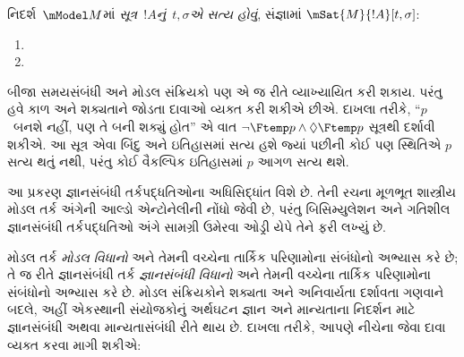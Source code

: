 \begin{defn}
  નિદર્શ~$\mModel M$માં \emph{સૂત્ર~$!A$નું~$t, \sigma$એ સત્ય હોવું},
  સંજ્ઞામાં $\mSat{M}{!A}[t, \sigma]$:
  \begin{enumerate}
  \item{} 
  \item{} 
  \end{enumerate} 
\end{defn}

બીજા સમયસંબંધી અને મોડલ સંક્રિયકો પણ એ જ રીતે વ્યાખ્યાયિત કરી
શકાય. પરંતુ હવે કાળ અને શક્યતાને જોડતા દાવાઓ વ્યક્ત કરી શકીએ છીએ.
દાખલા તરીકે, ``$p$~બનશે નહીં, પણ તે બની શક્યું હોત'' એ વાત
$\lnot \Ftemp p \land \Diamond \Ftemp p$ સૂત્રથી દર્શાવી શકીએ.
આ સૂત્ર એવા બિંદુ અને ઇતિહાસમાં સત્ય હશે જ્યાં પછીની કોઈ પણ સ્થિતિએ
$p$ સત્ય થતું નથી, પરંતુ કોઈ વૈકલ્પિક ઇતિહાસમાં $p$ આગળ સત્ય થશે.
\endgroup


\OLEndPartHook
\endgroup


\begingroup
\makeatletter{}\makeatother

\label{guunit:OLP-0482}


\begin{editorial}
  આ પ્રકરણ જ્ઞાનસંબંધી તર્કપદ્ધતિઓના અધિસિદ્ધાંત વિશે છે. તેની
  રચના મૂળભૂત શાસ્ત્રીય મોડલ તર્ક અંગેની આલ્ડો એન્ટોનેલીની નોંધો
  જેવી છે, પરંતુ બિસિમ્યુલેશન અને ગતિશીલ જ્ઞાનસંબંધી તર્કપદ્ધતિઓ
  અંગે સામગ્રી ઉમેરવા ઓડ્રી યેપે તેને ફરી લખ્યું છે.
\end{editorial}

\begingroup
\makeatletter{}\makeatother


\label{guunit:OLP-0483}


મોડલ તર્ક \emph{મોડલ વિધાનો} અને તેમની વચ્ચેના તાર્કિક પરિણામોના
સંબંધોનો અભ્યાસ કરે છે; તે જ રીતે જ્ઞાનસંબંધી તર્ક
\emph{જ્ઞાનસંબંધી વિધાનો} અને તેમની વચ્ચેના તાર્કિક પરિણામોના
સંબંધોનો અભ્યાસ કરે છે. મોડલ સંક્રિયકોને શક્યતા અને અનિવાર્યતા
દર્શાવતા ગણવાને બદલે, અહીં એકસ્થાની સંયોજકોનું અર્થઘટન જ્ઞાન અને
માન્યતાના નિદર્શન માટે જ્ઞાનસંબંધી અથવા માન્યતાસંબંધી રીતે થાય છે.
દાખલા તરીકે, આપણે નીચેના જેવા દાવા વ્યક્ત કરવા માગી શકીએ:

